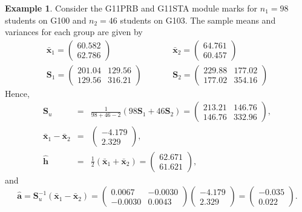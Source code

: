 \documentclass[]{book}
\theoremstyle{definition}
\theoremstyle{definition}
\newtheorem{example}{Example}[chapter]
\theoremstyle{definition}
\theoremstyle{remark}
\begin{document}
\begin{example}
\protect\hypertarget{exm:exnine4}{}{\label{exm:exnine4} }Consider the G11PRB and G11STA module marks for \(n_1 = 98\) students on G100 and \(n_2 = 46\) students on G103. The sample means and variances for each group are given by
\begin{eqnarray*}
\bar{\boldsymbol x}_1 = \begin{pmatrix} 60.582 \\ 62.786 \end{pmatrix} &\qquad& \bar{\boldsymbol x}_2 = \begin{pmatrix} 64.761 \\ 60.457 \end{pmatrix} \\
\boldsymbol S_1 = \begin{pmatrix} 201.04 & 129.56 \\ 129.56 & 316.21 \end{pmatrix} &\qquad& \boldsymbol S_2 = \begin{pmatrix} 229.88 & 177.02 \\ 177.02 & 354.16 \end{pmatrix}
\end{eqnarray*}
Hence,
\begin{eqnarray*}
\boldsymbol S_u &=& \frac{1}{98+46-2} \left(98 \boldsymbol S_1 + 46 \boldsymbol S_2 \right)= \begin{pmatrix} 213.21 & 146.76 \\ 146.76 & 332.96 \end{pmatrix}, \\
\bar{\boldsymbol x}_1 - \bar{\boldsymbol x}_2 &=& \begin{pmatrix} -4.179 \\ 2.329 \end{pmatrix}, \\
\hat{\boldsymbol h} &=& \frac{1}{2} (\bar{\boldsymbol x}_1 + \bar{\boldsymbol x}_2) = \begin{pmatrix} 62.671 \\ 61.621 \end{pmatrix},
\end{eqnarray*}
and
\[\hat{\boldsymbol a} = \boldsymbol S_u^{-1} (\bar{\boldsymbol x}_1 - \bar{\boldsymbol x}_2) = \begin{pmatrix} 0.0067 & -0.0030 \\ -0.0030 & 0.0043 \end{pmatrix} \begin{pmatrix} -4.179 \\ 2.329 \end{pmatrix} = \begin{pmatrix} -0.035 \\ 0.022 \end{pmatrix}.\]


\end{example}
\end{document}

